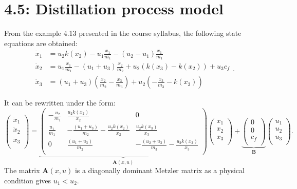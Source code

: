 \section*{4.5: Distillation process model}
From the example 4.13 presented in the course syllabus, the following state equations are obtained:
\begin{equation*} \begin{split}
\dot x_1 &= u_2 k(x_2) - u_{1}\frac{x_1}{m_1} - (u_2 - u_1) \frac{x_1}{m_1}\\
\dot x_2 &= u_1\frac{x_1}{m_1} - (u_1+u_3)\frac{x_2}{m_2} + u_2(k(x_3) - k(x_2)) + u_3c_f\\
\dot x_3 &= (u_1 + u_3)(\frac{x_2}{m_2} - \frac{x_3}{m_3}) + u_2(-\frac{x_3}{m_3} - k(x_3))
\end{split}. \end{equation*}

It can be rewritten under the form:
\begin{equation}
\begin{pmatrix}
\dot{x}_1\\
\dot{x}_2\\
\dot{x}_3\\
\end{pmatrix}=
\underbrace{
\begin{pmatrix}
-\frac{u_2}{m_1} & \frac{u_2k(x_2)}{x_2} & 0\\
\frac{u_1}{m_1}  & -\frac{(u_1+u_3)}{m_2}-\frac{u_2k(x_2)}{x_2}   & \frac{u_2k(x_3)}{x_3} \\
0 & \frac{(u_1+u_3)}{m_2} & -\frac{(u_2+u_3)}{m_3}-\frac{u_2k(x_3)}{x_3}\\
\end{pmatrix}}_{\mathbf{A}(x,u)}
\begin{pmatrix}
x_1\\
x_2\\
x_3\\
\end{pmatrix}+\underbrace{
\begin{pmatrix}
0\\
0\\
c_f\\
\end{pmatrix}}_{\mathbf{B}}
\begin{pmatrix}
u_1\\
u_2\\
u_3\\
\end{pmatrix}.
\label{eq:Ax5}
\end{equation}
The matrix $\mathbf{A}(x,u)$ is a diagonally dominant Metzler matrix as a physical condition gives $u_1<u_2$.

